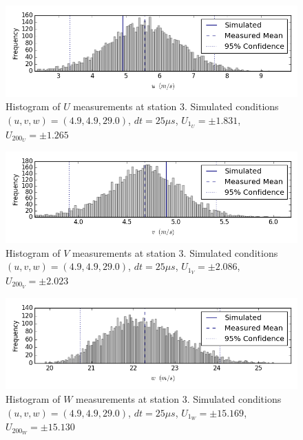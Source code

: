 \begin{figure}[H]
\centering
\includegraphics[width=6in]{figs/Ely_May28th03001/uncertainty_Ely_May28th03001_U}
\caption{Histogram of $U$ measurements at station 3. Simulated conditions $(u,v,w)=(4.9, 4.9, 29.0)$, $dt=25 \mu s$, $U_{1_{U}}=\pm 1.831$, $U_{200_{U}}=\pm 1.265$}
\label{fig:uncertainty_Ely_May28th03001_U}
\end{figure}


\begin{figure}[H]
\centering
\includegraphics[width=6in]{figs/Ely_May28th03001/uncertainty_Ely_May28th03001_V}
\caption{Histogram of $V$ measurements at station 3. Simulated conditions $(u,v,w)=(4.9, 4.9, 29.0)$, $dt=25 \mu s$, $U_{1_{V}}=\pm 2.086$, $U_{200_{V}}=\pm 2.023$}
\label{fig:uncertainty_Ely_May28th03001_V}
\end{figure}


\begin{figure}[H]
\centering
\includegraphics[width=6in]{figs/Ely_May28th03001/uncertainty_Ely_May28th03001_W}
\caption{Histogram of $W$ measurements at station 3. Simulated conditions $(u,v,w)=(4.9, 4.9, 29.0)$, $dt=25 \mu s$, $U_{1_{W}}=\pm 15.169$, $U_{200_{W}}=\pm 15.130$}
\label{fig:uncertainty_Ely_May28th03001_W}
\end{figure}



